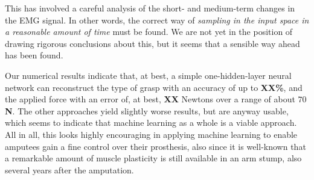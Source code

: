 This has involved a careful analysis of the short- and medium-term
changes in the EMG signal. In other words, the correct way of
\emph{sampling in the input space in a reasonable amount of time} must
be found. We are not yet in the position of drawing rigorous
conclusions about this, but it seems that a sensible way ahead has
been found.

Our numerical results indicate that, at best, a simple
one-hidden-layer neural network can reconstruct the type of grasp with
an accuracy of up to \textbf{XX\%}, and the applied force with an
error of, at best, \textbf{XX} Newtons over a range of about
\textbf{$70$N}. The other approaches yield slightly worse results, but
are anyway usable, which seems to indicate that machine learning as a
whole is a viable approach.  All in all, this looks highly encouraging
in applying machine learning to enable amputees gain a fine control
over their prosthesis, also since it is well-known \cite{...} that a
remarkable amount of muscle plasticity is still available in an arm
stump, also several years after the amputation.
